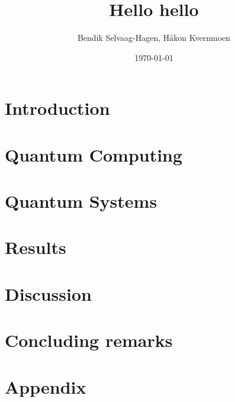\documentclass[twocolumn,english,notitlepage]{article}
\title{Hello hello}
\author{Bendik Selvaag-Hagen, Håkon Kvernmoen}
\date{\today}
\begin{document}

\tableofcontents

\section{Introduction}


\section{Quantum Computing}


\section{Quantum Systems}


\section{Results}


\section{Discussion}


\section{Concluding remarks} 



\renewcommand{\theequation}{\thesection.\arabic{equation}}
\newpage
\section{Appendix}
\begin{appendices}
     
\end{appendices}

\newpage

\end{document}
